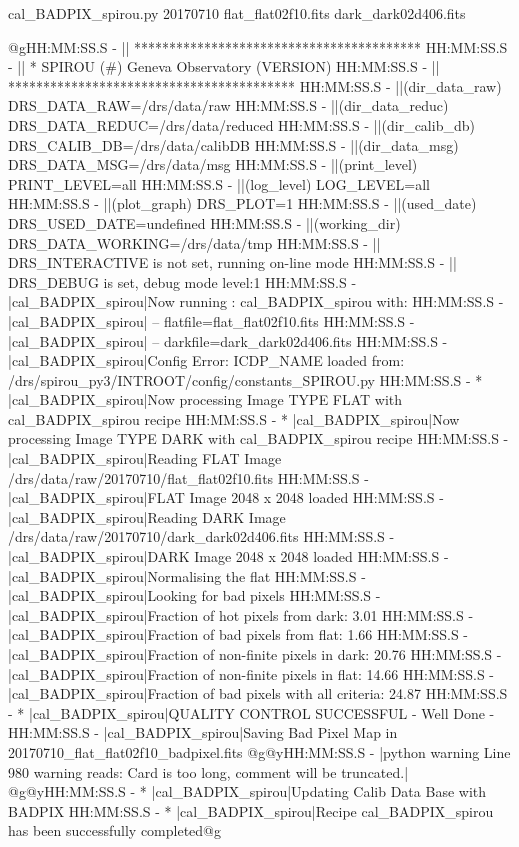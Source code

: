 \begin{cmdbox}[title={example}]
cal_BADPIX_spirou.py 20170710 flat_flat02f10.fits dark_dark02d406.fits
\end{cmdbox}
\begin{cmdboxprintspecial}[fontupper=\tiny]
@gHH:MM:SS.S -   || *****************************************
HH:MM:SS.S -   || * SPIROU \@(#) Geneva Observatory (VERSION)
HH:MM:SS.S -   || *****************************************
HH:MM:SS.S -   ||(dir_data_raw)      DRS_DATA_RAW=/drs/data/raw
HH:MM:SS.S -   ||(dir_data_reduc)    DRS_DATA_REDUC=/drs/data/reduced
HH:MM:SS.S -   ||(dir_calib_db)      DRS_CALIB_DB=/drs/data/calibDB
HH:MM:SS.S -   ||(dir_data_msg)      DRS_DATA_MSG=/drs/data/msg
HH:MM:SS.S -   ||(print_level)       PRINT_LEVEL=all         %
HH:MM:SS.S -   ||(log_level)         LOG_LEVEL=all         %
HH:MM:SS.S -   ||(plot_graph)        DRS_PLOT=1            %
HH:MM:SS.S -   ||(used_date)         DRS_USED_DATE=undefined
HH:MM:SS.S -   ||(working_dir)       DRS_DATA_WORKING=/drs/data/tmp
HH:MM:SS.S -   ||                    DRS_INTERACTIVE is not set, running on-line mode
HH:MM:SS.S -   ||                    DRS_DEBUG is set, debug mode level:1
HH:MM:SS.S -   |cal_BADPIX_spirou|Now running : cal_BADPIX_spirou with:
HH:MM:SS.S -   |cal_BADPIX_spirou|       -- flatfile=flat_flat02f10.fits
HH:MM:SS.S -   |cal_BADPIX_spirou|       -- darkfile=dark_dark02d406.fits
HH:MM:SS.S -   |cal_BADPIX_spirou|Config Error: ICDP_NAME loaded from: /drs/spirou_py3/INTROOT/config/constants_SPIROU.py
HH:MM:SS.S - * |cal_BADPIX_spirou|Now processing Image TYPE FLAT with cal_BADPIX_spirou recipe
HH:MM:SS.S - * |cal_BADPIX_spirou|Now processing Image TYPE DARK with cal_BADPIX_spirou recipe
HH:MM:SS.S -   |cal_BADPIX_spirou|Reading FLAT Image /drs/data/raw/20170710/flat_flat02f10.fits
HH:MM:SS.S -   |cal_BADPIX_spirou|FLAT Image 2048 x 2048 loaded
HH:MM:SS.S -   |cal_BADPIX_spirou|Reading DARK Image /drs/data/raw/20170710/dark_dark02d406.fits
HH:MM:SS.S -   |cal_BADPIX_spirou|DARK Image 2048 x 2048 loaded
HH:MM:SS.S -   |cal_BADPIX_spirou|Normalising the flat
HH:MM:SS.S -   |cal_BADPIX_spirou|Looking for bad pixels
HH:MM:SS.S -   |cal_BADPIX_spirou|Fraction of hot pixels from dark: 3.01 %
HH:MM:SS.S -   |cal_BADPIX_spirou|Fraction of bad pixels from flat: 1.66 %
HH:MM:SS.S -   |cal_BADPIX_spirou|Fraction of non-finite pixels in dark: 20.76 %
HH:MM:SS.S -   |cal_BADPIX_spirou|Fraction of non-finite pixels in flat: 14.66 %
HH:MM:SS.S -   |cal_BADPIX_spirou|Fraction of bad pixels with all criteria: 24.87 %
HH:MM:SS.S - * |cal_BADPIX_spirou|QUALITY CONTROL SUCCESSFUL - Well Done -
HH:MM:SS.S -   |cal_BADPIX_spirou|Saving Bad Pixel Map in 20170710_flat_flat02f10_badpixel.fits
@g@yHH:MM:SS.S - \@ |python warning Line 980  warning reads: Card is too long, comment will be truncated.|
@g@yHH:MM:SS.S - * |cal_BADPIX_spirou|Updating Calib Data Base with BADPIX
HH:MM:SS.S - * |cal_BADPIX_spirou|Recipe cal_BADPIX_spirou has been successfully completed@g
\end{cmdboxprintspecial}
